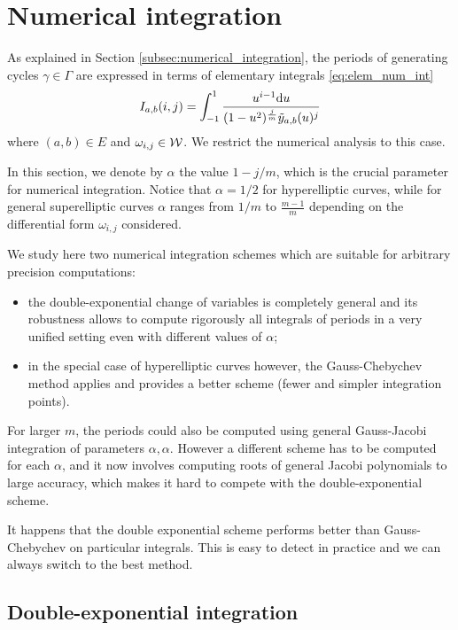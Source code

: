 \documentclass[main.tex]{subfiles}
\begin{document}
\section{Numerical integration}\label{sec:numerical_integration}

As explained in Section \ref{subsec:numerical_integration}, the periods
of generating cycles $\gamma\in \Gamma$ are expressed in terms of
elementary integrals
\eqref{eq:elem_num_int}
\begin{equation*}
    I_{a,b}(i,j) = \int_{-1}^1\frac{u^{i-1}\mathrm d u}{(1-u^2)^{\frac jm}\tilde{y}_{a,b}(u)^j}
\end{equation*}
where $(a,b)\in E$ and $\omega_{i,j}\in\mathcal{W}$.
We restrict the numerical analysis to this case.

In this section, we denote by $α$ the value $1-j/m$, which is the crucial parameter for numerical integration.
Notice that $α=1/2$ for hyperelliptic curves, while for general superelliptic curves $α$ ranges
from $1/m$ to $\frac{m-1}m$ depending on the differential form $\omega_{i,j}$ considered.

We study here two numerical integration schemes which are suitable for arbitrary
precision computations:
\begin{itemize}
    \item 
        the double-exponential change of variables is completely general \cite{Molin2010} and its robustness
allows to compute rigorously all integrals of periods in a very unified setting
even with different values of $\alpha$;
\item in the special case of hyperelliptic curves however,
    the Gauss-Chebychev method \cite[25.4.38]{AbramowitzStegun} applies and
    provides a better scheme (fewer and simpler integration points).
\end{itemize}
For larger $m$, the periods could also be computed using general Gauss-Jacobi integration
of parameters $\alpha,\alpha$. However a different scheme has to be computed for each $\alpha$,
and it now involves computing roots of general Jacobi polynomials to large accuracy, which
makes it hard to compete with the double-exponential scheme.

\begin{rmk}
    It happens that the double exponential scheme performs better than Gauss-Chebychev on
    particular integrals. This is easy to detect in practice and we can always switch to
    the best method.
\end{rmk}

\subsection{Double-exponential integration}\label{sec:de_int}
\end{document}
